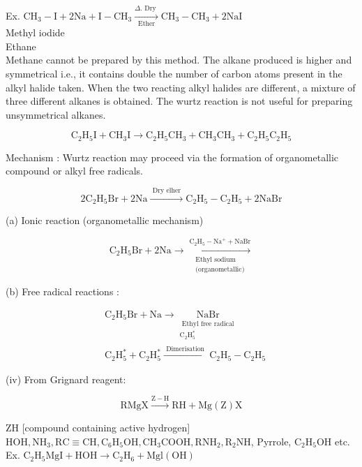 \documentclass[10pt]{article}
\begin{document}
Ex. $\mathrm{CH}_{3}-\mathrm{I}+2 \mathrm{Na}+\mathrm{I}-\mathrm{CH}_{3} \xrightarrow[\text { Ether }]{\Delta \text {. Dry }} \mathrm{CH}_{3}-\mathrm{CH}_{3}+2 \mathrm{NaI}$\\
Methyl iodide\\
Ethane\\
Methane cannot be prepared by this method. The alkane produced is higher and symmetrical i.e., it contains double the number of carbon atoms present in the alkyl halide taken. When the two reacting alkyl halides are different, a mixture of three different alkanes is obtained. The wurtz reaction is not useful for preparing unsymmetrical alkanes.

$$
\mathrm{C}_{2} \mathrm{H}_{5} \mathrm{I}+\mathrm{CH}_{3} \mathrm{I} \longrightarrow \mathrm{C}_{2} \mathrm{H}_{5} \mathrm{CH}_{3}+\mathrm{CH}_{3} \mathrm{CH}_{3}+\mathrm{C}_{2} \mathrm{H}_{5} \mathrm{C}_{2} \mathrm{H}_{5}
$$

Mechanism : Wurtz reaction may proceed via the formation of organometallic compound or alkyl free radicals.

$$
2 \mathrm{C}_{2} \mathrm{H}_{5} \mathrm{Br}+2 \mathrm{Na} \xrightarrow{\text { Dry elher }} \mathrm{C}_{2} \mathrm{H}_{5}-\mathrm{C}_{2} \mathrm{H}_{5}+2 \mathrm{NaBr}
$$

(a) Ionic reaction (organometallic mechanism)

$$
\mathrm{C}_{2} \mathrm{H}_{5} \mathrm{Br}+2 \mathrm{Na} \longrightarrow \xrightarrow[\substack{\text { Ethyl sodium } \\ \text { (organometallic) }}]{\mathrm{C}_{2} \mathrm{H}_{5}-\mathrm{Na}^{+}+\mathrm{NaBr}}
$$

(b) Free radical reactions :

$$
\begin{aligned}
& \mathrm{C}_{2} \mathrm{H}_{5} \mathrm{Br}+\mathrm{Na} \longrightarrow \underset{\substack{\text { Ethyl free radical } \\
\mathrm{C}_{2} \mathrm{H}_{5}^{*}}}{\mathrm{NaBr}} \\
& \mathrm{C}_{2} \mathrm{H}_{5}^{*}+\mathrm{C}_{2} \mathrm{H}_{5}^{*} \xrightarrow{\text { Dimerisation }} \mathrm{C}_{2} \mathrm{H}_{5}-\mathrm{C}_{2} \mathrm{H}_{5}
\end{aligned}
$$

(iv) From Grignard reagent:

$$
\mathrm{RMgX} \xrightarrow{\mathrm{Z}-\mathrm{H}} \mathrm{RH}+\mathrm{Mg}(\mathrm{Z}) \mathrm{X}
$$

ZH [compound containing active hydrogen]\\
$\mathrm{HOH}, \mathrm{NH}_{3}, \mathrm{RC} \equiv \mathrm{CH}, \mathrm{C}_{6} \mathrm{H}_{5} \mathrm{OH}, \mathrm{CH}_{3} \mathrm{COOH}, \mathrm{RNH}_{2}, \mathrm{R}_{2} \mathrm{NH}$, Pyrrole, $\mathrm{C}_{2} \mathrm{H}_{5} \mathrm{OH}$ etc.\\
Ex. $\mathrm{C}_{2} \mathrm{H}_{5} \mathrm{MgI}+\mathrm{HOH} \longrightarrow \mathrm{C}_{2} \mathrm{H}_{6}+\mathrm{Mgl}(\mathrm{OH})$
\end{document}
